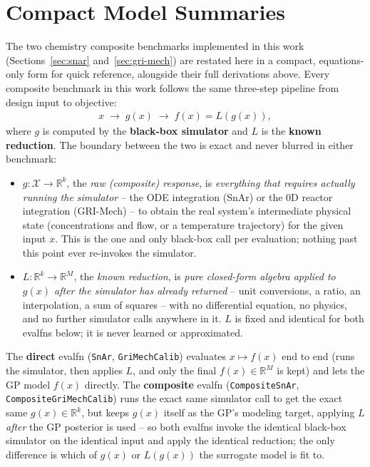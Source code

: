 \documentclass[11pt]{article}
\begin{document}
\section{Compact Model Summaries}
\label{sec:compact-summaries}

The two chemistry composite benchmarks implemented in this work
(Sections~\ref{sec:snar} and~\ref{sec:gri-mech}) are restated here in a
compact, equations-only form for quick reference, alongside their full
derivations above. Every composite benchmark in this work follows the
same three-step pipeline from design input to objective:
\begin{align}
x \;\longrightarrow\; g(x) \;\longrightarrow\; f(x) = L(g(x)),
\end{align}
where $g$ is computed by the \textbf{black-box simulator} and $L$ is
the \textbf{known reduction}. The boundary between the two is exact and
never blurred in either benchmark:
\begin{itemize}
\item $g: \mathcal{X} \to \mathbb{R}^k$, the \emph{raw (composite)
response}, is \emph{everything that requires actually running the
simulator} -- the ODE integration (SnAr) or the 0D reactor integration
(GRI-Mech) -- to obtain the real system's intermediate physical state
(concentrations and flow, or a temperature trajectory) for the given
input $x$. This is the one and only black-box call per evaluation; nothing
past this point ever re-invokes the simulator.
\item $L: \mathbb{R}^k \to \mathbb{R}^M$, the \emph{known reduction}, is
\emph{pure closed-form algebra applied to $g(x)$ after the simulator has
already returned} -- unit conversions, a ratio, an interpolation, a sum
of squares -- with no differential equation, no physics, and no further
simulator calls anywhere in it. $L$ is fixed and identical for both
evalfns below; it is never learned or approximated.
\end{itemize}
The \textbf{direct} evalfn (\texttt{SnAr}, \texttt{GriMechCalib})
evaluates $x \mapsto f(x)$ end to end (runs the simulator, then applies
$L$, and only the final $f(x) \in \mathbb{R}^M$ is kept) and lets the GP
model $f(x)$ directly. The \textbf{composite} evalfn
(\texttt{CompositeSnAr}, \texttt{CompositeGriMechCalib}) runs the exact
same simulator call to get the exact same $g(x) \in \mathbb{R}^k$, but
keeps $g(x)$ itself as the GP's modeling target, applying $L$
\emph{after} the GP posterior is used -- so both evalfns invoke the
identical black-box simulator on the identical input and apply the
identical reduction; the only difference is which of $g(x)$ or
$L(g(x))$ the surrogate model is fit to.
\end{document}
